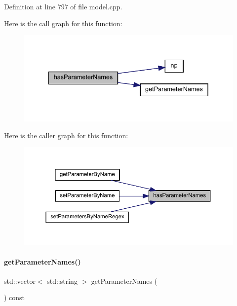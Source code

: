 Definition at line 797 of file model.\+cpp.

Here is the call graph for this function\+:
\nopagebreak
\begin{figure}[H]
\begin{center}
\leavevmode
\includegraphics[width=335pt]{classamici_1_1_model_a7b51ed26a01b793c832fe680d9543763_cgraph}
\end{center}
\end{figure}
Here is the caller graph for this function\+:
\nopagebreak
\begin{figure}[H]
\begin{center}
\leavevmode
\includegraphics[width=350pt]{classamici_1_1_model_a7b51ed26a01b793c832fe680d9543763_icgraph}
\end{center}
\end{figure}
\mbox{\label{classamici_1_1_model_aa99eb9052c2bbddc98547a0ad9a3c7bf}} 
\paragraph{\texorpdfstring{getParameterNames()}{getParameterNames()}}
{\footnotesize\ttfamily std\+::vector$<$ std\+::string $>$ get\+Parameter\+Names (\begin{DoxyParamCaption}{ }\end{DoxyParamCaption}) const\hspace{0.3cm}{\ttfamily [virtual]}}

